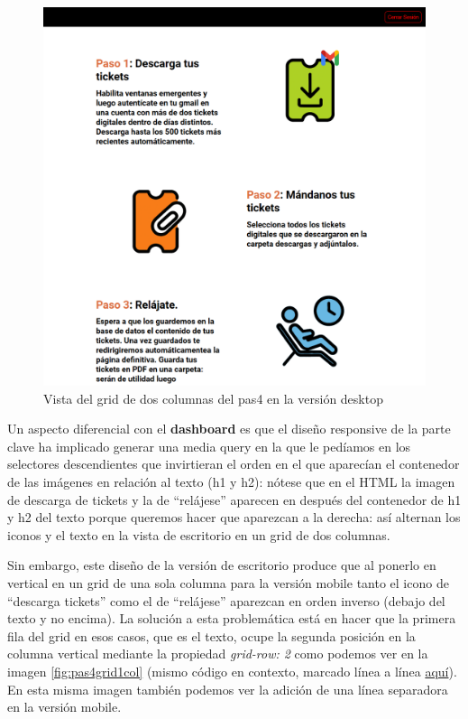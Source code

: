 \documentclass[a4paper,12pt]{report}
\begin{document}
	\FloatBarrier
	\begin{figure}[H]
		\centering
		\caption{Vista del grid de dos columnas del pas4 en la versión desktop}
		\includegraphics[width=1\linewidth]{img/pas4Grid2cols}

		\label{fig:pas4grid2cols}
	\end{figure}
	\FloatBarrier
	
	Un aspecto diferencial con el \textbf{dashboard} es que el diseño responsive de la parte clave ha implicado generar una media query en la que le pedíamos en los selectores descendientes que invirtieran el orden en el que aparecían el contenedor de las imágenes en relación al texto (h1 y h2): nótese que en el HTML la imagen de descarga de tickets y la de ``relájese'' aparecen en después del contenedor de h1 y h2 del texto porque queremos hacer que aparezcan a la derecha: así alternan los iconos y el texto en la vista de escritorio en un grid de dos columnas. 
	
	Sin embargo, este diseño de la versión de escritorio produce que al ponerlo en vertical en un grid de una sola columna para la versión mobile tanto el icono de ``descarga tickets'' como el de ``relájese'' aparezcan en orden inverso (debajo del texto y no encima). La solución a esta problemática está en hacer que la primera fila del grid en esos casos, que es el texto, ocupe la segunda posición en la columna vertical mediante la propiedad \textit{grid-row: 2} como podemos ver en la imagen \ref{fig:pas4grid1col} (mismo código en contexto, marcado línea a línea \href{https://github.com/blackcub3s/mercApp/blob/75141ebaa42e677993ba88e1dfe73d417ef6386c/APP%20WEB/__frontend__produccio__/app/css/pas4/estilsEspecificsPas4.css#L57-L65}{aquí}). En esta misma imagen también podemos ver la adición de una línea separadora en la versión mobile.
	
\end{document}
